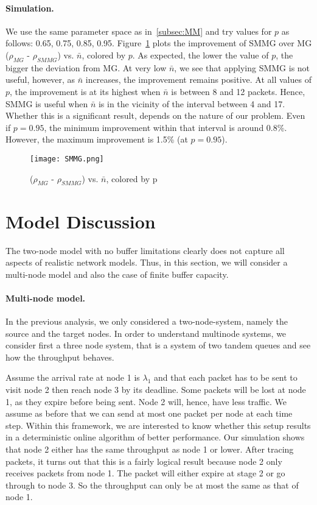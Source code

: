 \documentclass[oribibl]{llncs}
\begin{document}
\paragraph{Simulation.} We use the same parameter space as in~\ref{subsec:MM} and try values for $p$ as follows: 0.65, 0.75, 0.85, 0.95. Figure~\ref{fig:SMMG} plots the improvement of SMMG over MG ($\rho_{MG}$ - $\rho_{SMMG}$) vs. $\bar{n}$, colored by $p$.  As expected, the lower the value of $p$, the bigger the deviation from MG. At very low $\bar{n}$, we see that applying SMMG is not useful, however, as $\bar{n}$ increases, the improvement remains positive. At all values of $p$, the improvement is at its highest when $\bar{n}$ is between 8 and 12 packets. Hence, SMMG is useful when $\bar{n}$ is in the vicinity of the interval between 4 and 17. Whether this is a significant result, depends on the nature of our problem. Even if $p=0.95$, the minimum improvement within that interval is around 0.8\%. However, the maximum improvement is 1.5\% (at $p=0.95$). 

\begin{figure}[ht]\centering 
\texttt{[image: SMMG.png]}
\caption{($\rho_{MG}$ - $\rho_{SMMG}$) vs. $\bar{n}$, colored by p}
\label{fig:SMMG}
\end{figure}

\vspace{-24pt}
\section {Model Discussion}
\label{sec:MD}


The two-node model with no buffer limitations clearly does not capture all aspects of 
realistic network models.  Thus, in this section, we will consider a
multi-node model and also the case of finite buffer capacity.



\paragraph{Multi-node model.} In the previous analysis, we only
considered a two-node-system, namely the source and the target
nodes.  In order to understand multinode systems, we consider first 
a three node system, that is a
system of two tandem  queues and see how the throughput behaves.

Assume the arrival rate at node 1 is $\lambda_1$ and that each packet
has to be sent to visit node 2 then reach node 3 by its deadline. Some
packets will be lost at node 1, as they expire before being sent. Node
2 will, hence, have less traffic. We assume as before that we can send
at most one packet per node at each time step. Within this framework,
we are interested to know whether this setup results in a
deterministic online algorithm of better performance. Our simulation
shows that node 2 either has the same throughput as node 1 or
lower. After tracing packets, it turns out that this is a fairly
logical result because node 2 only receives packets from node 1. The
packet will either expire at stage 2 or go through to node 3. So the
throughput can only be at most the same as that of node 1.
\end{document}

